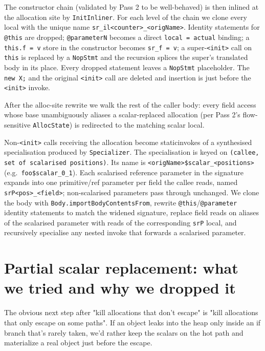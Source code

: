 \documentclass[12pt,a4paper]{article}
\begin{document}
The constructor chain (validated by Pass 2 to be well-behaved) is then
inlined at the allocation site by \texttt{InitInliner}. For each level
of the chain we clone every local with the unique name
\texttt{sr\_il<counter>\_<origName>}. Identity statements for
\texttt{@this} are dropped; \texttt{@parameterN} becomes a direct
\texttt{local = actual} binding; a \texttt{this.f = v} store in the
constructor becomes \texttt{sr\_f = v}; a super-\texttt{<init>} call
on \texttt{this} is replaced by a \texttt{NopStmt} and the recursion
splices the super's translated body in its place. Every dropped
statement leaves a \texttt{NopStmt} placeholder. The
\texttt{new X;} and the original \texttt{<init>} call are deleted and
insertion is just before the \texttt{<init>} invoke.

After the alloc-site rewrite we walk the rest of the caller body:
every field access whose base unambiguously aliases a scalar-replaced
allocation (per Pass 2's flow-sensitive \texttt{AllocState}) is
redirected to the matching scalar local.

Non-\texttt{<init>} calls receiving the allocation become staticinvokes
of a synthesised specialisation produced by \texttt{Specializer}. The
specialisation is keyed on \texttt{(callee, set of scalarised
positions)}. Its name is
\texttt{<origName>\$scalar\_<positions>} (e.g.\
\texttt{foo\$scalar\_0\_1}). Each scalarised reference parameter in the
signature expands into one primitive/ref parameter per field the callee
reads, named \texttt{srP<pos>\_<field>}; non-scalarised
parameters pass through unchanged. We clone the body with
\texttt{Body.importBodyContentsFrom}, rewrite \texttt{@this}/\texttt{@parameter} identity
statements to match the widened signature, replace field reads on
aliases of the scalarised parameter with reads of the corresponding
\texttt{srP} local, and recursively specialise any nested invoke
that forwards a scalarised parameter.


\section{Partial scalar replacement: what we tried and why we dropped it}

The obvious next step after "kill allocations that don't escape" is "kill
allocations that only escape on some paths". If an object leaks into the
heap only inside an if branch that's rarely taken, we'd rather keep the
scalars on the hot path and materialize a real object just before the escape.
\end{document}
